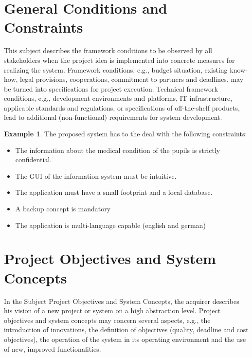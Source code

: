 \documentclass[12pt]{article}
\theoremstyle{definition}
\newtheorem{example}{Example}
\newenvironment{explanation}{%
   \setlength{\parindent}{0pt}
   \itshape
   \color{blue}
}{}
\begin{document}
\pagebreak

\section{General Conditions and Constraints}
\begin{explanation}
This subject describes the framework conditions to be observed by all stakeholders when the project idea is implemented into concrete measures for realizing the system. Framework conditions, e.g., budget situation, existing know-how, legal provisions, cooperations, commitment to partners and deadlines, may be turned into specifications for project execution.
Technical framework conditions, e.g., development environments and platforms, IT infrastructure, applicable standards and regulations, or specifications of off-the-shelf products, lead to additional (non-functional) requirements for system development.
\end{explanation}

\begin{example}
The proposed system has to the deal with the following constraints:
\begin{itemize}
\item The information about the medical condition of the pupils is strictly confidential.
\item The GUI of the information system must be intuitive.
\item The application must have a small footprint and a local database.
\item A backup concept is mandatory
\item The application is multi-language capable (english and german)
\end{itemize}
\end{example}

\pagebreak

\section{Project Objectives and System Concepts}
\begin{explanation}
In the Subject Project Objectives and System Concepts, the acquirer describes his vision of a new project or system on a high abstraction level. Project objectives and system concepts may concern several aspects, e.g., the introduction of innovations, the definition of objectives (quality, deadline and cost objectives), the operation of the system in its operating environment and the use of new, improved functionalities.
\end{explanation}
\end{document}
